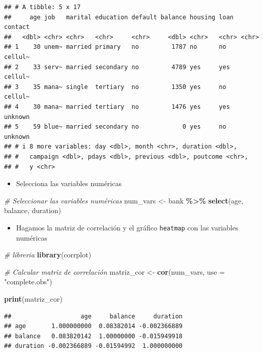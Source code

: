 \documentclass[
]{book}
\newenvironment{Shaded}{\begin{snugshade}}{\end{snugshade}}
\newcommand{\AttributeTok}[1]{\textcolor[rgb]{0.13,0.29,0.53}{#1}}
\newcommand{\CommentTok}[1]{\textcolor[rgb]{0.56,0.35,0.01}{\textit{#1}}}
\newcommand{\FunctionTok}[1]{\textcolor[rgb]{0.13,0.29,0.53}{\textbf{#1}}}
\newcommand{\NormalTok}[1]{#1}
\newcommand{\OtherTok}[1]{\textcolor[rgb]{0.56,0.35,0.01}{#1}}
\newcommand{\SpecialCharTok}[1]{\textcolor[rgb]{0.81,0.36,0.00}{\textbf{#1}}}
\newcommand{\StringTok}[1]{\textcolor[rgb]{0.31,0.60,0.02}{#1}}
\providecommand{\tightlist}{%
  \setlength{\itemsep}{0pt}\setlength{\parskip}{0pt}}
\begin{document}
\begin{verbatim}
## # A tibble: 5 x 17
##     age job   marital education default balance housing loan  contact
##   <dbl> <chr> <chr>   <chr>     <chr>     <dbl> <chr>   <chr> <chr>  
## 1    30 unem~ married primary   no         1787 no      no    cellul~
## 2    33 serv~ married secondary no         4789 yes     yes   cellul~
## 3    35 mana~ single  tertiary  no         1350 yes     no    cellul~
## 4    30 mana~ married tertiary  no         1476 yes     yes   unknown
## 5    59 blue~ married secondary no            0 yes     no    unknown
## # i 8 more variables: day <dbl>, month <chr>, duration <dbl>,
## #   campaign <dbl>, pdays <dbl>, previous <dbl>, poutcome <chr>,
## #   y <chr>
\end{verbatim}

\begin{itemize}
\tightlist
\item
  Selecciona las variables numéricas
\end{itemize}

\begin{Shaded}
\begin{Highlighting}[]
\CommentTok{\# Seleccionar las variables numéricas}
\NormalTok{num\_vars }\OtherTok{\textless{}{-}}\NormalTok{ bank }\SpecialCharTok{\%\textgreater{}\%} 
  \FunctionTok{select}\NormalTok{(age, balance, duration)}
\end{Highlighting}
\end{Shaded}

\begin{itemize}
\tightlist
\item
  Hagamos la matriz de correlación y el gráfico \texttt{heatmap} con las variables numéricas
\end{itemize}

\begin{Shaded}
\begin{Highlighting}[]
\CommentTok{\# libreria}
\FunctionTok{library}\NormalTok{(corrplot)}

\CommentTok{\# Calcular matriz de correlación}
\NormalTok{matriz\_cor }\OtherTok{\textless{}{-}} \FunctionTok{cor}\NormalTok{(num\_vars, }\AttributeTok{use =} \StringTok{"complete.obs"}\NormalTok{)}

\FunctionTok{print}\NormalTok{(matriz\_cor)}
\end{Highlighting}
\end{Shaded}

\begin{verbatim}
##                   age     balance     duration
## age       1.000000000  0.08382014 -0.002366889
## balance   0.083820142  1.00000000 -0.015949918
## duration -0.002366889 -0.01594992  1.000000000
\end{verbatim}
\end{document}

